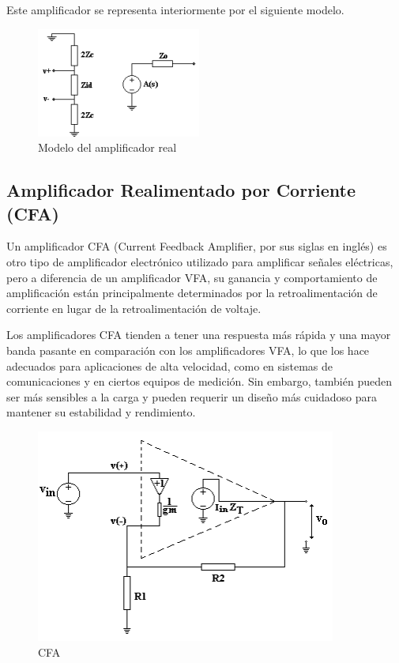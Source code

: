 \documentclass[12pt,A4paper,titlepage]{article}
\begin{document}
\bigskip
\hspace{1mm} Este amplificador se representa interiormente por el siguiente modelo.

\bigskip
\begin{figure}[!h]
    \centering
    \includegraphics[scale=1]{Imagenes/VFA Modelo de amplificador real.png}
    \caption{Modelo del amplificador real}
\end{figure}

\newpage

\subsection{Amplificador Realimentado por Corriente (CFA)}

\hspace{1mm} Un amplificador CFA (Current Feedback Amplifier, por sus siglas en inglés) es otro tipo de amplificador electrónico utilizado para amplificar señales eléctricas, pero a diferencia de un amplificador VFA, su ganancia y comportamiento de amplificación están principalmente determinados por la retroalimentación de corriente en lugar de la retroalimentación de voltaje.

\bigskip
\hspace{1mm} Los amplificadores CFA tienden a tener una respuesta más rápida y una mayor banda pasante en comparación con los amplificadores VFA, lo que los hace adecuados para aplicaciones de alta velocidad, como en sistemas de comunicaciones y en ciertos equipos de medición. Sin embargo, también pueden ser más sensibles a la carga y pueden requerir un diseño más cuidadoso para mantener su estabilidad y rendimiento.

\bigskip
\begin{figure}[!h]
    \centering
    \includegraphics[scale=1]{Imagenes/CFA.png}
    \caption{CFA}
\end{figure}
\end{document}
